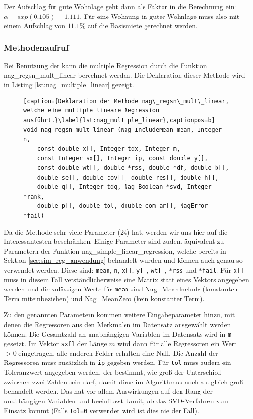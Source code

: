 Der Aufschlag für gute Wohnlage geht dann als Faktor in die Berechnung ein: $\alpha = exp(0.105) = 1.111$.
Für eine Wohnung in guter Wohnlage muss also mit einem Aufschlag von $11.1 \%$ auf die Basismiete gerechnet werden.


\subsubsection{Methodenaufruf}

Bei Benutzung der \naglib kann die multiple Regression durch die Funktion nag\_regsn\_mult\_linear berechnet werden.
Die Deklaration dieser Methode wird in Listing \ref{lst:nag_multiple_linear} gezeigt.
\begin{figure}[t]
\begin{lstlisting}[caption={Deklaration der Methode nag\_regsn\_mult\_linear, welche eine multiple lineare Regression ausführt.}\label{lst:nag_multiple_linear},captionpos=b]
void nag_regsn_mult_linear (Nag_IncludeMean mean, Integer n, 
    const double x[], Integer tdx, Integer m, 
    const Integer sx[], Integer ip, const double y[], 
    const double wt[], double *rss, double *df, double b[], 
    double se[], double cov[], double res[], double h[], 
    double q[], Integer tdq, Nag_Boolean *svd, Integer *rank, 
    double p[], double tol, double com_ar[], NagError *fail)
\end{lstlisting}
\end{figure}

Da die Methode sehr viele Parameter (24) hat, werden wir uns hier auf die Interessantesten beschränken.
Einige Parameter sind zudem äquivalent zu Parametern der Funktion nag\_simple\_linear\_regression, welche bereits in Sektion \ref{sec:sim_reg_anwendung} behandelt wurden und können auch genau so verwendet werden.
Diese sind: \lstinline{mean}, \lstinline{n}, \lstinline{x[]}, \lstinline{y[]}, \lstinline{wt[]}, \lstinline{*rss} und \lstinline{*fail}.
Für \lstinline{x[]} muss in diesem Fall verständlicherweise eine Matrix statt eines Vektors angegeben werden und die zulässigen Werte für \lstinline{mean} sind Nag\_MeanInclude (konstanten Term miteinbeziehen) und Nag\_MeanZero (kein konstanter Term).

Zu den genannten Parametern kommen weitere Eingabeparameter hinzu, mit denen die Regressoren aus den Merkmalen im Datensatz ausgewählt werden können.
Die Gesamtzahl an unabhängigen Variablen im Datensatz wird in \lstinline{m} gesetzt.
Im Vektor \lstinline{sx[]} der Länge $m$ wird dann für alle Regressoren ein Wert $>0$ eingetragen, alle anderen Felder erhalten eine Null.
Die Anzahl der Regressoren muss zusätzlich in \lstinline{ip} gegeben werden.
Für \lstinline{tol} muss zudem ein Toleranzwert angegeben werden, der bestimmt, wie groß der Unterschied zwischen zwei Zahlen sein darf, damit diese im Algorithmus noch als gleich groß behandelt werden. 
Das hat vor allem Auswirkungen auf den Rang der unabhängigen Variablen und beeinflusst damit, ob das SVD-Verfahren zum Einsatz kommt (Falls \lstinline{tol=0} verwendet wird ist dies nie der Fall).


